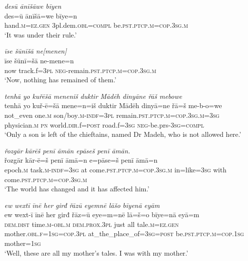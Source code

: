\ea \label{ŠJ.103}
\textit{desū ānīšāwe bīyen} \\ 
\gll des=ū ānīšā=we bīye=n \\ 
 hand\textsc{.m}\textsc{=ez.gen} 3pl.dem\textsc{.obl}\textsc{=compl} be\textsc{.pst}\textsc{.ptcp}\textsc{.m}\textsc{=cop}\textsc{.3sg}\textsc{.m} \\ 
\glt `It was under their rule.'
\z 
 
\ea \label{ŠJ.104}
\textit{īse šūnīšā ne[menen]} \\ 
\gll īse šūnī=šā ne-mene=n \\ 
 now track.f\textsc{=3pl} \textsc{neg-}remain\textsc{.pst}\textsc{.ptcp}\textsc{.m}\textsc{=cop}\textsc{.3sg}\textsc{.m} \\ 
\glt `Now, nothing has remained of them.'
\z 
 
\ea \label{ŠJ.105}
\textit{tenhā yo kuřēšā meneniš duktir Mādēh dinyāne řāš mebowe} \\ 
\gll tenhā yo kuř-ē=šā mene=n=iš duktir Mādēh dinyā=ne řā=š me-b-o=we \\ 
 not\_even one\textsc{.m} son/boy\textsc{.m}\textsc{-indf}\textsc{=3pl} remain\textsc{.pst}\textsc{.ptcp}\textsc{.m}\textsc{=cop}\textsc{.3sg}\textsc{.m}\textsc{=3sg} physician\textsc{.m} \textsc{pn} world\textsc{.dir}.f\textsc{=\textsc{post}} road.f\textsc{=3sg} \textsc{neg-}be.prs\textsc{-3sg}\textsc{=compl} \\ 
\glt `Only a son is left of the chieftains, named Dr Madeh, who is not allowed here.'
\z 
 
\ea \label{ŠJ.109}
\textit{řozgār kārēš penī āmān epāseš penī āmān.} \\ 
\gll řozgār kār-ē=š penī āmā=n e=pāse=š penī āmā=n \\ 
 epoch\textsc{.m} task\textsc{.m}\textsc{-indf}\textsc{=3sg} at come\textsc{.pst}\textsc{.ptcp}\textsc{.m}\textsc{=cop}\textsc{.3sg}\textsc{.m} in=like\textsc{=3sg} with come\textsc{.pst}\textsc{.ptcp}\textsc{.m}\textsc{=cop}\textsc{.3sg}\textsc{.m} \\ 
\glt `The world has changed and it has affected him.'
\z 
 

\ea \label{KŠ.1}
\textit{ew wextī īnē her girđ řāzū eyemnē lāšo bīyenā eyām} \\ 
\gll ew wext-ī īnē her girđ řāz=ū eye=m=nē lā=š=o bīye=nā eyā=m \\ 
 \textsc{dem.dist} time\textsc{.m}\textsc{-obl}\textsc{.m} \textsc{dem.prox}\textsc{.3pl} just all tale\textsc{.m}\textsc{=ez.gen} mother\textsc{.obl}\textsc{.f}\textsc{=\textsc{1sg}}\textsc{=cop}\textsc{.3pl} at\_the\_place\_of\textsc{=3sg}\textsc{=\textsc{post}} be\textsc{.pst}\textsc{.ptcp}\textsc{.m}\textsc{=cop}\textsc{.\textsc{1sg}} mother\textsc{=\textsc{1sg}} \\ 
\glt `Well, these are all my mother’s tales. I was with my mother.'
\z 
 
